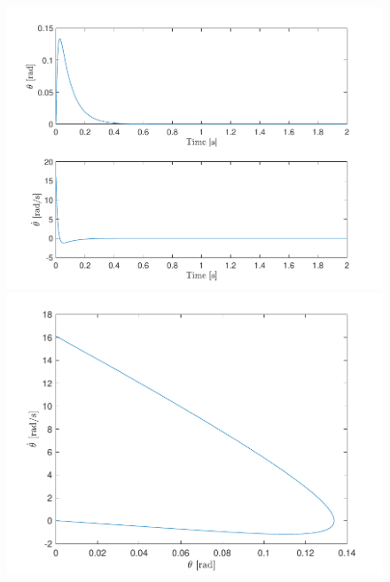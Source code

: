 \documentclass[10pt]{article}
\begin{document}
\begin{figure}[ht]
    \centering
    \begin{minipage}[b]{0.45\textwidth}
        \centering
        \includegraphics[clip,width=1\linewidth]{lab1/figs/section7_controlled_state_evolution_x_0_2.pdf}
    \end{minipage}
    \begin{minipage}[b]{0.45\textwidth}
        \centering
        \includegraphics[clip,width=1\linewidth]{lab1/figs/section7_controlled_state_orbit_x_0_2.pdf}
    \end{minipage}
\end{figure}
\end{document}
